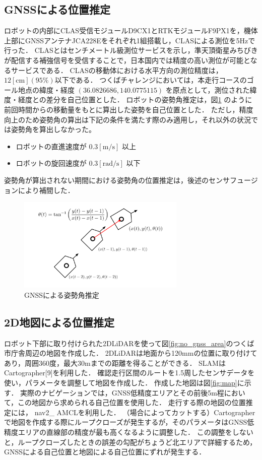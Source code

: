 \documentclass[platex,dvipdfmx]{rbproceedings}
\begin{document}
\subsection{GNSSによる位置推定}\label{ss:gnss_localization}
ロボットの内部にCLAS受信モジュールD9CX1とRTKモジュールF9PX1を，機体上部にGNSSアンテナJCA228Eをそれぞれ1組搭載し，CLASによる測位を5Hzで行った．
CLASとはセンチメートル級測位サービスを示し，準天頂衛星みちびきが配信する補強信号を受信することで，日本国内では精度の高い測位が可能となるサービスである．
CLASの移動体における水平方向の測位精度は，$12[\mathrm{cm}] (95 \%)$以下である．
つくばチャレンジにおいては，本走行コースのゴール地点の緯度・経度 $(36.0826686 ,140.0775115)$ を原点として，測位された緯度・経度との差分を自己位置とした．
ロボットの姿勢角推定は，図\ref{fig:gnss_orientaiton} のように前回時間からの移動量をもとに算出した姿勢を自己位置とした．
ただし，精度向上のため姿勢角の算出は下記の条件を満たす際のみ適用し，それ以外の状況では姿勢角を算出しなかった。
\begin{itemize}
    \item ロボットの直進速度が $0.3[\mathrm{m/s}]$ 以上
    \item ロボットの旋回速度が $0.3[\mathrm{rad/s}]$ 以下
\end{itemize}
姿勢角が算出されない期間における姿勢角の位置推定は，後述のセンサフュージョンにより補間した．



\begin{figure}[htbp]
    \centering   
    \includegraphics[keepaspectratio,width=80mm]{fig/gnss_orientation.png}
    \caption{GNSSによる姿勢角推定}
    \label{fig:gnss_orientaiton}
\end{figure}

\subsection{2D地図による位置推定}\label{ss:map_localization}
ロボット下部に取り付けられた2DLiDARを使って図\ref{fig:no_gnss_area}のつくば市庁舎周辺の地図を作成した．
2DLiDARは地面から120mmの位置に取り付けてあり，周囲360度，最大30mまでの距離を得ることができる．
SLAMはCartographer[9]を利用した．
確認走行区間のルートを1.5周したセンサデータを使い，パラメータを調整して地図を作成した．
作成した地図は図\ref{fig:map}に示す．
実際のナビゲーションでは，GNSS低精度エリアとその前後5m程において，この地図から求められる自己位置を使用した．
走行する際の地図の位置推定には， nav2\_ AMCLを利用した．
（場合によってカットする）Cartographerで地図を作成する際にループクローズが発生するが，そのパラメータはGNSS低精度エリアの直線部の精度が最も高くなるように調整した．
この調整をしないと，ループクローズしたときの誤差の勾配がちょうど北エリアで詳細するため，GNSSによる自己位置と地図による自己位置にずれが発生する．
\end{document}
